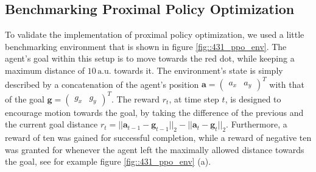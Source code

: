 \subsection{Benchmarking Proximal Policy Optimization}
\label{sec::431_bpp}
To validate the implementation of proximal policy optimization, we used a little benchmarking environment that is shown in figure \ref{fig::431_ppo_env}. The agent's goal within this setup is to move towards the red dot, while keeping a maximum distance of $10\,\text{a.u.}$ towards it. The environment's state is simply described by a concatenation of the agent's position $\bm{a} = \begin{pmatrix}
a_x & a_y
\end{pmatrix}^T$ with that of the goal $\bm{g} = \begin{pmatrix}
g_x & g_y
\end{pmatrix}^T$. The reward $r_t$, at time step $t$, is designed to encourage motion towards the goal, by taking the difference of the previous and the current goal distance $r_t = ||\bm{a}_{t-1}-\bm{g}_{t-1}||_2 - ||\bm{a}_{t}-\bm{g}_{t}||_2$. Furthermore, a reward of ten was gained for successful completion, while a reward of negative ten was granted for whenever the agent left the maximally allowed distance towards the goal, see for example figure \ref{fig::431_ppo_env} (a).
